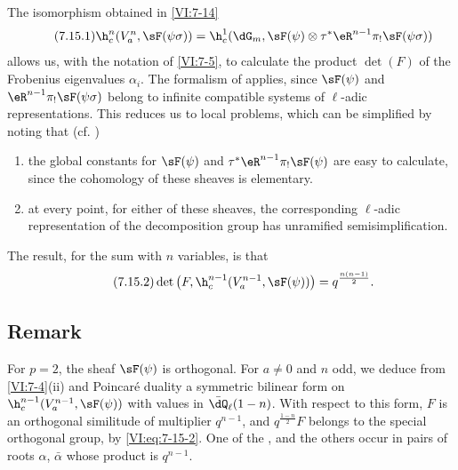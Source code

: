 The isomorphism obtained in \ref{VI:7-14} 
\begin{equation*}\tag{7.15.1}\label{VI:eq:7-15-1}
  \h_c^n(V_a^n,\sF(\psi\sigma)) = \h_c^1(\dG_m,\sF(\psi)\otimes \tau^\ast \eR^{n-1} \pi_! \sF(\psi\sigma)) 
\end{equation*}
allows us, with the notation of \ref{VI:7-5}, to calculate the product $\det(F)$ 
of the Frobenius eigenvalues $\alpha_i$. The formalism of  
applies, since $\sF(\psi)$ and $\eR^{n-1} \pi_! \sF(\psi\sigma)$ 
belong to infinite compatible systems of $\ell$-adic 
representations. This reduces us to local problems, which can be 
simplified by noting that (cf. ) 
\begin{enumerate}[\indent a)]
  \item the global constants for 
    $\sF(\psi)$ and $\tau^\ast \eR^{n-1} \pi_! \sF(\psi)$ are easy to calculate, since the cohomology of these sheaves is elementary. 
  \item at every point, for either of these sheaves, the 
    corresponding $\ell$-adic representation of the decomposition group 
    has unramified semisimplification. 
\end{enumerate}

The result, for the sum with $n$ variables, is that 
\begin{equation*}\tag{7.15.2}\label{VI:eq:7-15-2}
  \det\left(F,\h_c^{n-1}(V_a^{n-1},\sF(\psi))\right) = q^{\frac{n(n-1)}{2}} \text{.} 
\end{equation*}





\subsection{Remark}\label{VI:7-16}

For $p=2$, the sheaf $\sF(\psi)$ is orthogonal. For $a\ne 0$ and $n$ 
odd, we deduce from \ref{VI:7-4}(ii) and Poincaré duality a 
symmetric bilinear form on $\h_c^{n-1}(V_a^{n-1},\sF(\psi))$ with 
values in $\bar\dQ_\ell(1-n)$. With respect to this form, $F$ is an 
orthogonal similitude of multiplier $q^{n-1}$, and $q^{\frac{1-n}{2}} F$ 
belongs to the special orthogonal group, by \eqref{VI:eq:7-15-2}. One 
of the , and the others 
occur in pairs of roots $\alpha$, $\bar\alpha$ whose product is $q^{n-1}$. 

